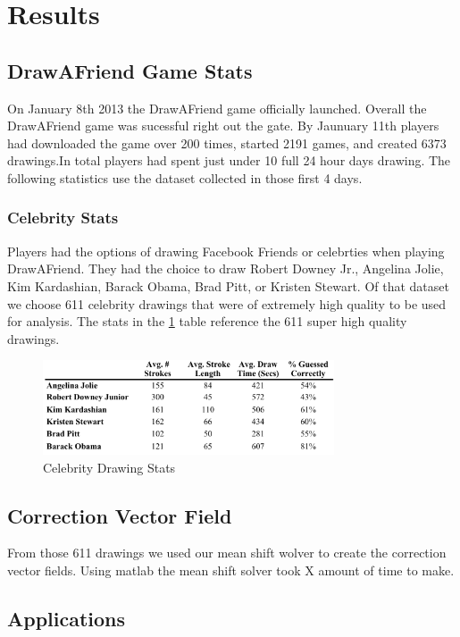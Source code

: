 \section{Results}
\subsection{DrawAFriend Game Stats}
On January 8th 2013 the DrawAFriend game officially launched. Overall the DrawAFriend game was sucessful right out the gate. By Jaunuary 11th players had downloaded the game over 200 times, started 2191 games, and created 6373 drawings.In total players had spent just under 10 full 24 hour days drawing. The following statistics use the dataset collected in those first 4 days. 

\subsubsection{Celebrity Stats}
Players had the options of drawing Facebook Friends or celebrties when playing DrawAFriend. They had the choice to draw Robert Downey Jr., Angelina Jolie, Kim Kardashian, Barack Obama, Brad Pitt, or Kristen Stewart.  Of that dataset we choose 611 celebrity drawings that were of extremely high quality to be used for analysis. The stats in the \ref{fig:daf-stats} table reference the 611 super high quality drawings.

\begin{figure}[b]
  \centering%
\includegraphics[height=1.1in]{./figures/daf-stats-cropped.pdf}
  \caption{Celebrity Drawing Stats}
  \label{fig:daf-stats}
\end{figure}

\subsection {Correction Vector Field}
From those 611 drawings we used our mean shift wolver to create the correction vector fields. Using matlab the mean shift solver took X amount of time to make. 

\subsection {Applications}
